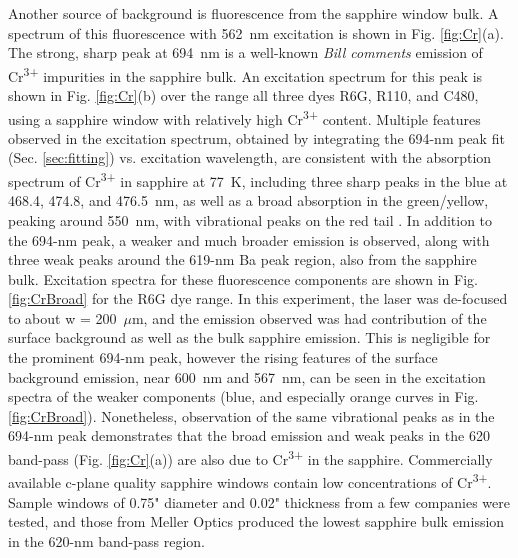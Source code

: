 Another source of background is fluorescence from the sapphire window bulk.  A spectrum of this fluorescence with 562~nm excitation is shown in Fig. \ref{fig:Cr}(a).  The strong, sharp peak at 694~nm is a well-known \emph{\color{gray}Bill comments} emission of Cr\textsuperscript{3+} impurities in the sapphire bulk.  An excitation spectrum for this peak is shown in Fig. \ref{fig:Cr}(b) over the range all three dyes R6G, R110, and C480, using a sapphire window with relatively high Cr\textsuperscript{3+} content.  Multiple features observed in the excitation spectrum, obtained by integrating the 694-nm peak fit (Sec. \ref{sec:fitting}) vs. excitation wavelength, are consistent with the absorption spectrum of Cr\textsuperscript{3+} in sapphire at 77~K, including three sharp peaks in the blue at 468.4, 474.8, and 476.5~nm, as well as a broad absorption in the green/yellow, peaking around 550~nm, with vibrational peaks on the red tail \cite{SapphireFord,SapphireMcclure}.  In addition to the 694-nm peak, a weaker and much broader emission is observed, along with three weak peaks around the 619-nm Ba peak region, also from the sapphire bulk.  Excitation spectra for these fluorescence components are shown in Fig. \ref{fig:CrBroad} for the R6G dye range.  In this experiment, the laser was de-focused to about w = 200~$\mu$m, and the emission observed was had contribution of the surface background as well as the bulk sapphire emission.  This is negligible for the prominent 694-nm peak, however the rising features of the surface background emission, near 600~nm and 567~nm, can be seen in the excitation spectra of the weaker components (blue, and especially orange curves in Fig. \ref{fig:CrBroad}).  Nonetheless, observation of the same vibrational peaks as in the 694-nm peak demonstrates that the broad emission and weak peaks in the 620 band-pass (Fig. \ref{fig:Cr}(a)) are also due to Cr\textsuperscript{3+} in the sapphire.  Commercially available c-plane quality sapphire windows contain low concentrations of Cr\textsuperscript{3+}.  Sample windows of 0.75" diameter and 0.02" thickness from a few companies were tested, and those from Meller Optics produced the lowest sapphire bulk emission in the 620-nm band-pass region.

